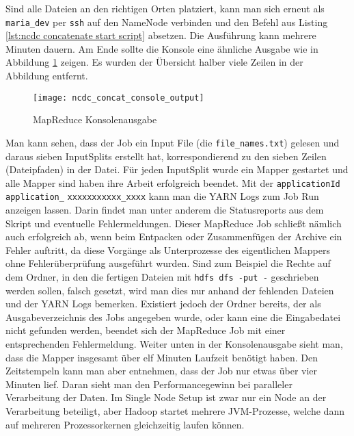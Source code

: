 

Sind alle Dateien an den richtigen Orten platziert, kann man sich erneut als \verb|maria_dev| per \verb|ssh| auf den NameNode verbinden und den Befehl aus Listing \ref{lst:ncdc concatenate start script} absetzen. Die Ausführung kann mehrere Minuten dauern. Am Ende sollte die Konsole eine ähnliche Ausgabe wie in Abbildung \ref{fig:ncdc concat console output} zeigen. Es wurden der Übersicht halber viele Zeilen in der Abbildung entfernt. 

\begin{figure}[ht]
    \centering
    \texttt{[image: ncdc\_concat\_console\_output]}
    \caption[MapReduce Konsolenausgabe]{MapReduce Konsolenausgabe}
    \label{fig:ncdc concat console output}
\end{figure}

Man kann sehen, dass der Job ein Input File (die \verb|file_names.txt|) gelesen und daraus sieben InputSplits erstellt hat, korrespondierend zu den sieben Zeilen (Dateipfaden) in der Datei. Für jeden InputSplit wurde ein Mapper gestartet und alle Mapper sind haben ihre Arbeit erfolgreich beendet. Mit der \verb|applicationId application_| \verb|xxxxxxxxxxx_xxxx| kann man die YARN Logs zum Job Run anzeigen lassen. Darin findet man unter anderem die Statusreports aus dem Skript und eventuelle Fehlermeldungen. Dieser MapReduce Job schließt nämlich auch erfolgreich ab, wenn beim Entpacken oder Zusammenfügen der Archive ein Fehler auftritt, da diese Vorgänge als Unterprozesse des eigentlichen Mappers ohne Fehlerüberprüfung ausgeführt wurden. Sind zum Beispiel die Rechte auf dem Ordner, in den die fertigen Dateien mit \verb|hdfs dfs -put -| geschrieben werden sollen, falsch gesetzt, wird man dies nur anhand der fehlenden Dateien und der YARN Logs bemerken. Existiert jedoch der Ordner bereits, der als Ausgabeverzeichnis des Jobs angegeben wurde, oder kann eine die Eingabedatei nicht gefunden werden, beendet sich der MapReduce Job mit einer entsprechenden Fehlermeldung. Weiter unten in der Konsolenausgabe sieht man, dass die Mapper insgesamt über elf Minuten Laufzeit benötigt haben. Den Zeitstempeln kann man aber entnehmen, dass der Job nur etwas über vier Minuten lief. Daran sieht man den Performancegewinn bei paralleler Verarbeitung der Daten. Im Single Node Setup ist zwar nur ein Node an der Verarbeitung beteiligt, aber Hadoop startet mehrere JVM-Prozesse, welche dann auf mehreren Prozessorkernen gleichzeitig laufen können.

